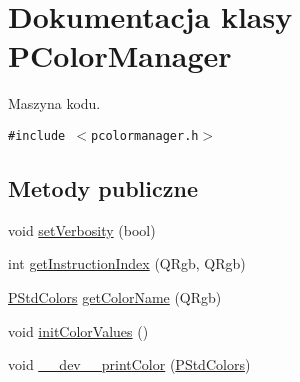 \hypertarget{classPColorManager}{
\section{Dokumentacja klasy PColorManager}
\label{classPColorManager}
}
Maszyna kodu.  


{\tt \#include $<$pcolormanager.h$>$}

\subsection*{Metody publiczne}
\begin{CompactItemize}
\item 
void \hyperlink{classPColorManager_ee267bb2056457f73dcf1115e7d3c973}{setVerbosity} (bool)
\item 
int \hyperlink{classPColorManager_36a84d6e85c87edf65fdb511690ed434}{getInstructionIndex} (QRgb, QRgb)
\item 
\hyperlink{penums_8h_4fb01e50a2da85245f7cea7856eca8ec}{PStdColors} \hyperlink{classPColorManager_27aeb6623eaf527db2d7428ab038958c}{getColorName} (QRgb)
\item 
void \hyperlink{classPColorManager_e9793e8da1800653b11609376098695c}{initColorValues} ()
\item 
void \hyperlink{classPColorManager_83e07cad55aed7d9133e42a71d514d26}{\_\-\_\-dev\_\-\_\-printColor} (\hyperlink{penums_8h_4fb01e50a2da85245f7cea7856eca8ec}{PStdColors})
\end{CompactItemize}
